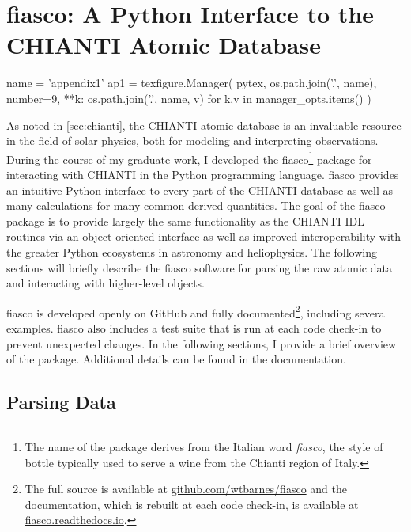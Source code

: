 \chapter{fiasco: A Python Interface to the CHIANTI Atomic Database}\label{ap:fiasco}
\thispagestyle{firstpageofchapterstyle}

\begin{pycode}[appendix1]
name = 'appendix1'
ap1 = texfigure.Manager(
    pytex,
    os.path.join('.', name),
    number=9,
    **{k: os.path.join('.', name, v) for k,v in manager_opts.items()}
)
\end{pycode}

As noted in \autoref{sec:chianti}, the CHIANTI atomic database is an invaluable resource in the field of solar physics, both for modeling and interpreting observations. During the course of my graduate work, I developed the fiasco\footnote{The name of the package derives from the Italian word \textit{fiasco}, the style of bottle typically used to serve a wine from the Chianti region of Italy.} package for interacting with CHIANTI in the Python programming language. fiasco provides an intuitive Python interface to every part of the CHIANTI database as well as many calculations for many common derived quantities. The goal of the fiasco package is to provide largely the same functionality as the CHIANTI IDL routines via an object-oriented interface \citep[similar to ChiantiPy][]{landi_chiantiatomic_2012,barnes_chiantipy_2017} as well as improved interoperability with the greater Python ecosystems in astronomy and heliophysics. The following sections will briefly describe the fiasco software for parsing the raw atomic data and interacting with higher-level objects.

fiasco is developed openly on GitHub and fully documented\footnote{The full source is available at \href{https://github.com/wtbarnes/fiasco}{github.com/wtbarnes/fiasco} and the documentation, which is rebuilt at each code check-in, is available at \href{https://fiasco.readthedocs.io/en/latest/}{fiasco.readthedocs.io}.}, including several examples. fiasco also includes a test suite that is run at each code check-in to prevent unexpected changes. In the following sections, I provide a brief overview of the package. Additional details can be found in the documentation.  

\section{Parsing Data}\label{sec:parsing-chianti}

